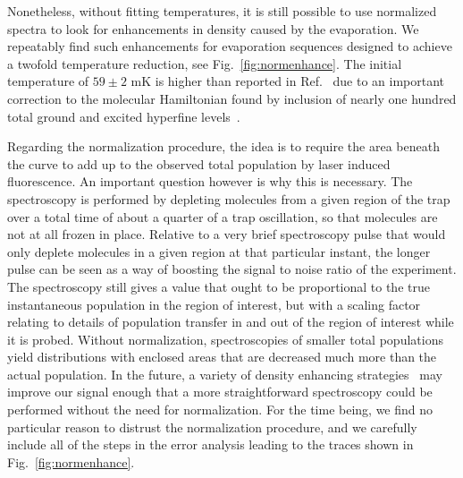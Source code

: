 \documentclass[%
 reprint,
 amsmath,amssymb,
 aps,
pra,
]{revtex4-1}
\begin{document}

Nonetheless, without fitting temperatures, it is still possible to use normalized spectra to look for enhancements in density caused by the evaporation.
We repeatably find such enhancements for evaporation sequences designed to achieve a twofold temperature reduction, see Fig.~\ref{fig:normenhance}.
The initial temperature of $59\pm2\text{ mK}$ is higher than reported in Ref.~\cite{Stuhl2012evap} due to an important correction to the molecular Hamiltonian found by inclusion of nearly one hundred total ground and excited hyperfine levels~\cite{Maeda2015}.

Regarding the normalization procedure, the idea is to require the area beneath the curve to add up to the observed total population by laser induced fluorescence.
An important question however is why this is necessary.
The spectroscopy is performed by depleting molecules from a given region of the trap over a total time of about a quarter of a trap oscillation, so that molecules are not at all frozen in place.
Relative to a very brief spectroscopy pulse that would only deplete molecules in a given region at that particular instant, the longer pulse can be seen as a way of boosting the signal to noise ratio of the experiment.
The spectroscopy still gives a value that ought to be proportional to the true instantaneous population in the region of interest, but with a scaling factor relating to details of population transfer in and out of the region of interest while it is probed.
Without normalization, spectroscopies of smaller total populations yield distributions with enclosed areas that are decreased much more than the actual population.
In the future, a variety of density enhancing strategies~\cite{smt} may improve our signal enough that a more straightforward spectroscopy could be performed without the need for normalization.
For the time being, we find no particular reason to distrust the normalization procedure, and we carefully include all of the steps in the error analysis leading to the traces shown in Fig.~\ref{fig:normenhance}.

\end{document}
